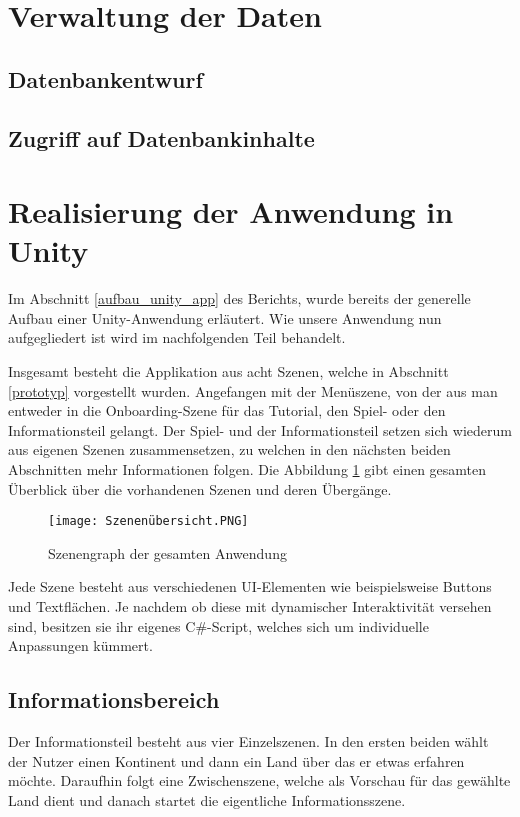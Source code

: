 \section{Verwaltung der Daten}
\subsection{Datenbankentwurf}\label{datenbankentwurf}
\subsection{Zugriff auf Datenbankinhalte}\label{zugriff_datenbank}

\section{Realisierung der Anwendung in Unity}
Im Abschnitt \ref{aufbau_unity_app} des Berichts, wurde bereits der generelle Aufbau einer Unity-Anwendung erläutert.
Wie unsere Anwendung nun aufgegliedert ist wird im nachfolgenden Teil behandelt.

Insgesamt besteht die Applikation aus acht Szenen, welche in Abschnitt \ref{prototyp} vorgestellt wurden. Angefangen mit der Menüszene, von der aus man entweder in die Onboarding-Szene für das Tutorial, den Spiel- oder den Informationsteil gelangt. 
Der Spiel- und der Informationsteil setzen sich wiederum aus eigenen Szenen zusammensetzen, zu welchen in den nächsten beiden Abschnitten mehr Informationen folgen. 
Die Abbildung \ref{fig:scenegraph} gibt einen gesamten Überblick über die vorhandenen Szenen und deren Übergänge.

\begin{figure} [h]
\centering
\texttt{[image: Szenenübersicht.PNG]}
\caption{Szenengraph der gesamten Anwendung}
\label{fig:scenegraph}
\end{figure}

Jede Szene besteht aus verschiedenen UI-Elementen wie beispielsweise Buttons und Textflächen. Je nachdem ob diese mit dynamischer Interaktivität versehen sind, besitzen sie ihr eigenes C\#-Script, welches sich um individuelle Anpassungen kümmert.

\subsection{Informationsbereich}
Der Informationsteil besteht aus vier Einzelszenen. 
In den ersten beiden wählt der Nutzer einen Kontinent und dann ein Land über das er etwas erfahren möchte.
Daraufhin folgt eine Zwischenszene, welche als Vorschau für das gewählte Land dient und danach startet die eigentliche Informationsszene. 

